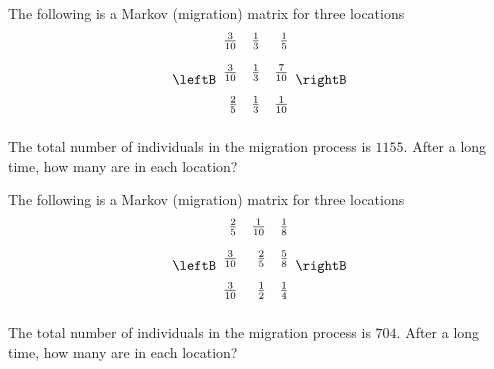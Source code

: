 \begin{enumialphparenastyle}
\begin{ex} The following is a Markov (migration) matrix for three locations
\begin{equation*}
\leftB
\begin{array}{rrr}
\vspace{0.05in}\frac{3}{10} & \vspace{0.05in}\frac{1}{3} & \vspace{0.05in}\frac{1}{5} \\
\vspace{0.05in}\frac{3}{10} & \vspace{0.05in}\frac{1}{3} & \vspace{0.05in}\frac{7}{10} \\
\vspace{0.05in}\frac{2}{5} & \vspace{0.05in}\frac{1}{3} & \vspace{0.05in}\frac{1}{10}
\end{array}
\rightB 
\end{equation*}
The total number of individuals in the migration process is $1155.$ After a
long time, how many are in each location?
\end{ex}

\begin{ex} The following is a Markov (migration) matrix for three locations
\begin{equation*}
\leftB
\begin{array}{rrr}
\vspace{0.05in}\frac{2}{5} & \vspace{0.05in}\frac{1}{10} & \vspace{0.05in}\frac{1}{8} \\
\vspace{0.05in}\frac{3}{10} & \vspace{0.05in}\frac{2}{5} & \vspace{0.05in}\frac{5}{8} \\
\vspace{0.05in}\frac{3}{10} & \vspace{0.05in}\frac{1}{2} & \vspace{0.05in}\frac{1}{4}
\end{array}
\rightB 
\end{equation*}
The total number of individuals in the migration process is $704.$ After a
long time, how many are in each location?
\end{ex}


\end{enumialphparenastyle}
